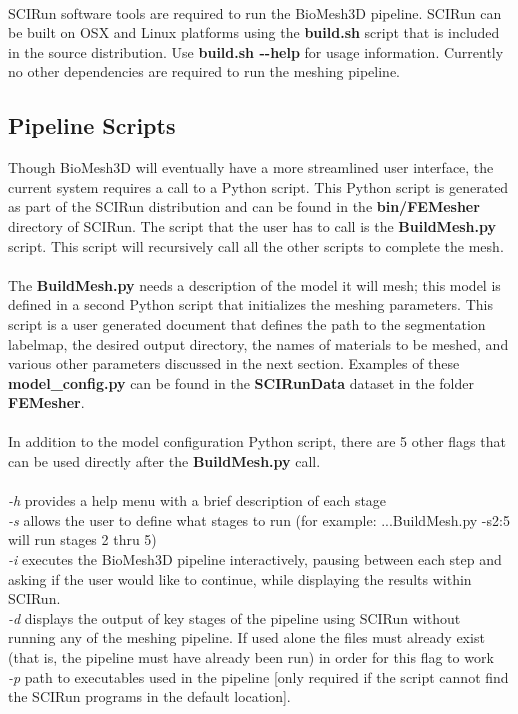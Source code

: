 \documentclass[fleqn,12pt,openany]{book}
\begin{document}
\paragraph{}
SCIRun software tools are required to run the BioMesh3D pipeline.
SCIRun can be built on OSX and Linux platforms using the {\bf build.sh} script that is included in the source distribution.
Use {\bf build.sh {-}{-}help} for usage information.
Currently no other dependencies are required to run the meshing pipeline. 

\subsection{Pipeline Scripts}

Though BioMesh3D will eventually have a more streamlined user interface, the current 
system requires a call to a Python script. This Python script is generated as 
part of the SCIRun distribution and can be found in the {\bf bin/FEMesher}
directory of SCIRun. The script that the user has to call is the {\bf BuildMesh.py }
script. This script will recursively call all the other scripts to complete the
mesh.

\paragraph{}
The {\bf BuildMesh.py} needs a description of the model it will mesh; this
model is defined in a second Python script that initializes the meshing parameters.
This script is a user generated document that defines 
the path to the segmentation labelmap, the desired output directory, the names 
of materials to be meshed, and various other parameters discussed in the next section. 
Examples of these {\bf model\_config.py} can be found in the {\bf SCIRunData}
dataset in the folder {\bf FEMesher}.

\paragraph{}
In addition to the model configuration Python script, there are 5 other flags 
that can be used directly after the {\bf BuildMesh.py} call. \\ \\
\emph{-h} provides a help menu with a brief description of each stage \\
\emph{-s} allows the user to define what stages to run (for example: ...BuildMesh.py -s2:5 will run stages 2 thru 5) \\
\emph{-i} executes the BioMesh3D pipeline interactively, pausing between each step and asking if the user would like to continue, while displaying the results within SCIRun. \\
\emph{-d} displays the output of key stages of the pipeline using SCIRun without running any of the meshing pipeline. If used alone the files must already exist (that is, the pipeline must have already been run) in order for this flag to work \\
\emph{-p} path to executables used in the pipeline [only required if the script cannot find the SCIRun programs in the default location].
\end{document}
